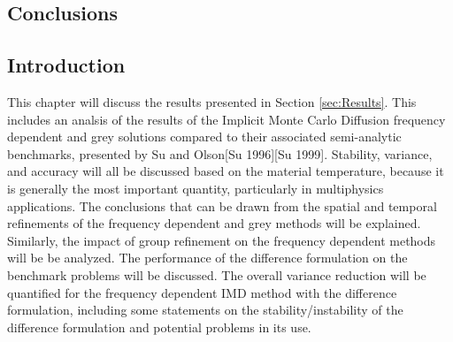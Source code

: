 
\begin{center}
\section{Conclusions}
\label{sec:Conclusions}
\end{center}

\aboveSubSecSkip

\subsection{Introduction}
\label{sec:Conclusions-Intro}

\noindent
	\indent This chapter will discuss the results presented in Section \ref{sec:Results}. This includes an analsis of the results of the Implicit Monte Carlo Diffusion frequency dependent and grey solutions compared to their associated semi-analytic benchmarks, presented by Su and Olson[Su 1996][Su 1999]. Stability, variance, and accuracy will all be discussed based on the material temperature, because it is generally the most important quantity, particularly in multiphysics applications. The conclusions that can be drawn from the spatial and temporal refinements of the frequency dependent and grey methods will be explained. Similarly, the impact of group refinement on the frequency dependent methods will be be analyzed. The performance of the difference formulation on the benchmark problems will be discussed. The overall variance reduction will be quantified for the frequency dependent IMD method with the difference formulation, including some statements on the stability/instability of the difference formulation and potential problems in its use. 
			
\belowSubSecSkip



